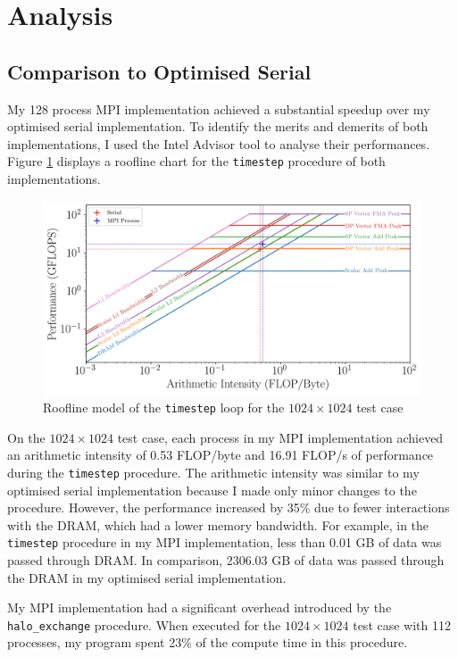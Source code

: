 \documentclass[twocolumn, a4paper]{article}
\begin{document}
\section{Analysis}

\subsection{Comparison to Optimised Serial}

My 128 process MPI implementation achieved a substantial speedup over my optimised serial implementation.
To identify the merits and demerits of both implementations, I used the Intel Advisor tool to analyse their performances.
Figure \ref{fig:roofline} displays a roofline chart for the \texttt{timestep} procedure of both implementations.

\begin{figure}[htbp]
  \centering
  \includegraphics[width=\linewidth]{roofline.png}
  \caption{Roofline model of the \texttt{timestep} loop for the $1024\times1024$ test case}\label{fig:roofline}
\end{figure}

On the $1024 \times 1024$ test case, each process in my MPI implementation achieved an arithmetic intensity of 0.53 FLOP/byte and 16.91 FLOP/s of performance during the \texttt{timestep} procedure.
The arithmetic intensity was similar to my optimised serial implementation because I made only minor changes to the procedure.
However, the performance increased by 35\% due to fewer interactions with the DRAM, which had a lower memory bandwidth.
For example, in the \texttt{timestep} procedure in my MPI implementation, less than 0.01 GB of data was passed through DRAM.
In comparison, 2306.03 GB of data was passed through the DRAM in my optimised serial implementation.

My MPI implementation had a significant overhead introduced by the \texttt{halo\_exchange} procedure.
When executed for the $1024\times1024$ test case with 112 processes, my program spent 23\% of the compute time in this procedure.
\end{document}

